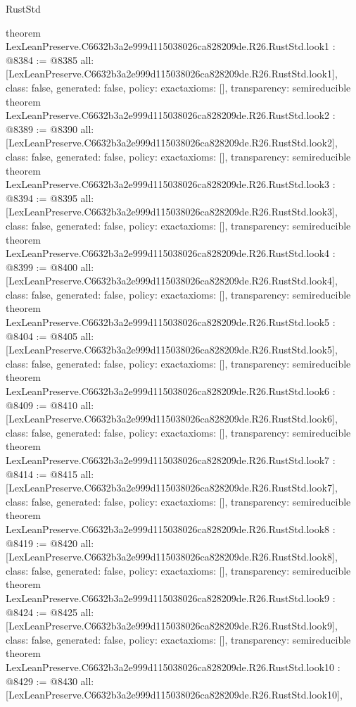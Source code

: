 \begin{lexlean}{RustStd}
\begin{coremodule}
{}
theorem LexLeanPreserve.C6632b3a2e999d115038026ca828209de.R26.RustStd.look1 : @8384 := @8385 {
  all: [LexLeanPreserve.C6632b3a2e999d115038026ca828209de.R26.RustStd.look1],
  class: false,
  generated: false,
  policy: exact{axioms: []},
  transparency: semireducible
}
theorem LexLeanPreserve.C6632b3a2e999d115038026ca828209de.R26.RustStd.look2 : @8389 := @8390 {
  all: [LexLeanPreserve.C6632b3a2e999d115038026ca828209de.R26.RustStd.look2],
  class: false,
  generated: false,
  policy: exact{axioms: []},
  transparency: semireducible
}
theorem LexLeanPreserve.C6632b3a2e999d115038026ca828209de.R26.RustStd.look3 : @8394 := @8395 {
  all: [LexLeanPreserve.C6632b3a2e999d115038026ca828209de.R26.RustStd.look3],
  class: false,
  generated: false,
  policy: exact{axioms: []},
  transparency: semireducible
}
theorem LexLeanPreserve.C6632b3a2e999d115038026ca828209de.R26.RustStd.look4 : @8399 := @8400 {
  all: [LexLeanPreserve.C6632b3a2e999d115038026ca828209de.R26.RustStd.look4],
  class: false,
  generated: false,
  policy: exact{axioms: []},
  transparency: semireducible
}
theorem LexLeanPreserve.C6632b3a2e999d115038026ca828209de.R26.RustStd.look5 : @8404 := @8405 {
  all: [LexLeanPreserve.C6632b3a2e999d115038026ca828209de.R26.RustStd.look5],
  class: false,
  generated: false,
  policy: exact{axioms: []},
  transparency: semireducible
}
theorem LexLeanPreserve.C6632b3a2e999d115038026ca828209de.R26.RustStd.look6 : @8409 := @8410 {
  all: [LexLeanPreserve.C6632b3a2e999d115038026ca828209de.R26.RustStd.look6],
  class: false,
  generated: false,
  policy: exact{axioms: []},
  transparency: semireducible
}
theorem LexLeanPreserve.C6632b3a2e999d115038026ca828209de.R26.RustStd.look7 : @8414 := @8415 {
  all: [LexLeanPreserve.C6632b3a2e999d115038026ca828209de.R26.RustStd.look7],
  class: false,
  generated: false,
  policy: exact{axioms: []},
  transparency: semireducible
}
theorem LexLeanPreserve.C6632b3a2e999d115038026ca828209de.R26.RustStd.look8 : @8419 := @8420 {
  all: [LexLeanPreserve.C6632b3a2e999d115038026ca828209de.R26.RustStd.look8],
  class: false,
  generated: false,
  policy: exact{axioms: []},
  transparency: semireducible
}
theorem LexLeanPreserve.C6632b3a2e999d115038026ca828209de.R26.RustStd.look9 : @8424 := @8425 {
  all: [LexLeanPreserve.C6632b3a2e999d115038026ca828209de.R26.RustStd.look9],
  class: false,
  generated: false,
  policy: exact{axioms: []},
  transparency: semireducible
}
theorem LexLeanPreserve.C6632b3a2e999d115038026ca828209de.R26.RustStd.look10 : @8429 := @8430 {
  all: [LexLeanPreserve.C6632b3a2e999d115038026ca828209de.R26.RustStd.look10],
}
\end{coremodule}
\end{lexlean}
